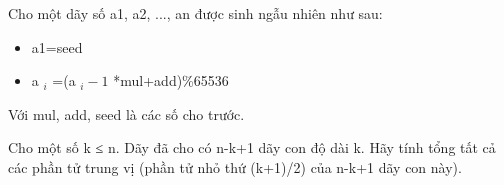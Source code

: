 Cho một dãy số a1, a2, ..., an được sinh ngẫu nhiên như sau:  
\begin{itemize}
	\item     a1=seed   
	\item     a    $_     i    $    =(a    $_     i-1    $    *mul+add)\%65536   
\end{itemize}

   Với mul, add, seed là các số cho trước.  

   Cho một số k ≤ n. Dãy đã cho có n-k+1 dãy con độ dài k. Hãy tính tổng tất cả các phần tử trung vị (phần tử nhỏ thứ (k+1)/2) của n-k+1 dãy con này).  

\